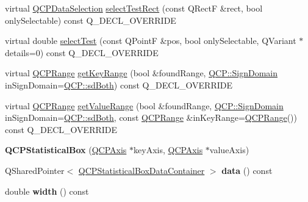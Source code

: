 \begin{DoxyCompactItemize}
\item 
virtual \hyperlink{class_q_c_p_data_selection}{Q\+C\+P\+Data\+Selection} \hyperlink{class_q_c_p_statistical_box_a42febad6ad5e924a151434cc434b4ffc}{select\+Test\+Rect} (const Q\+RectF \&rect, bool only\+Selectable) const Q\+\_\+\+D\+E\+C\+L\+\_\+\+O\+V\+E\+R\+R\+I\+DE
\item 
virtual double \hyperlink{class_q_c_p_statistical_box_a1607fa92f829c631107c20ccb2d70a6d}{select\+Test} (const Q\+PointF \&pos, bool only\+Selectable, Q\+Variant $\ast$details=0) const Q\+\_\+\+D\+E\+C\+L\+\_\+\+O\+V\+E\+R\+R\+I\+DE
\item 
virtual \hyperlink{class_q_c_p_range}{Q\+C\+P\+Range} \hyperlink{class_q_c_p_statistical_box_a77d2d13301dfe60c13adfaa17fc1802f}{get\+Key\+Range} (bool \&found\+Range, \hyperlink{namespace_q_c_p_afd50e7cf431af385614987d8553ff8a9}{Q\+C\+P\+::\+Sign\+Domain} in\+Sign\+Domain=\hyperlink{namespace_q_c_p_afd50e7cf431af385614987d8553ff8a9a3dee7e9cd2fedce9253b83e172626a6c}{Q\+C\+P\+::sd\+Both}) const Q\+\_\+\+D\+E\+C\+L\+\_\+\+O\+V\+E\+R\+R\+I\+DE
\item 
virtual \hyperlink{class_q_c_p_range}{Q\+C\+P\+Range} \hyperlink{class_q_c_p_statistical_box_ab3388a21d0c2e86fbc0cba9c06ceb49b}{get\+Value\+Range} (bool \&found\+Range, \hyperlink{namespace_q_c_p_afd50e7cf431af385614987d8553ff8a9}{Q\+C\+P\+::\+Sign\+Domain} in\+Sign\+Domain=\hyperlink{namespace_q_c_p_afd50e7cf431af385614987d8553ff8a9a3dee7e9cd2fedce9253b83e172626a6c}{Q\+C\+P\+::sd\+Both}, const \hyperlink{class_q_c_p_range}{Q\+C\+P\+Range} \&in\+Key\+Range=\hyperlink{class_q_c_p_range}{Q\+C\+P\+Range}()) const Q\+\_\+\+D\+E\+C\+L\+\_\+\+O\+V\+E\+R\+R\+I\+DE
\item 
\mbox{\label{class_q_c_p_statistical_box_a75c2b3e7fcd0741cc981693a2ba63b27}} 
{\bfseries Q\+C\+P\+Statistical\+Box} (\hyperlink{class_q_c_p_axis}{Q\+C\+P\+Axis} $\ast$key\+Axis, \hyperlink{class_q_c_p_axis}{Q\+C\+P\+Axis} $\ast$value\+Axis)
\item 
\mbox{\label{class_q_c_p_statistical_box_adb59a4851304f0303ab6ee3536039c5d}} 
Q\+Shared\+Pointer$<$ \hyperlink{class_q_c_p_data_container}{Q\+C\+P\+Statistical\+Box\+Data\+Container} $>$ {\bfseries data} () const
\item 
\mbox{\label{class_q_c_p_statistical_box_ae589b7481dec6ef8e50ebb6492d296f1}} 
double {\bfseries width} () const

\end{DoxyCompactItemize}
